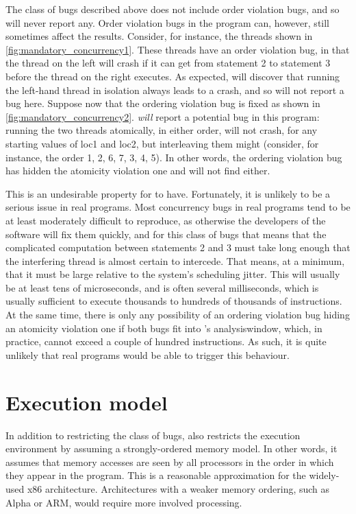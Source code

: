 The class of bugs described above does not include order violation
bugs, and so {\technique} will never report any.  Order violation bugs
in the program can, however, still sometimes affect the results.
Consider, for instance, the threads shown in
\autoref{fig:mandatory_concurrency1}.  These threads have an order
violation bug, in that the thread on the left will crash if it can get
from statement 2 to statement 3 before the thread on the right
executes.  As expected, {\technique} will discover that running the
left-hand thread in isolation always leads to a crash, and so will not
report a bug here.  Suppose now that the ordering violation bug is
fixed as shown in \autoref{fig:mandatory_concurrency2}.  {\Technique}
\emph{will} report a potential bug in this program: running the two
threads atomically, in either order, will not crash, for any starting
values of loc1 and loc2, but interleaving them might (consider, for
instance, the order 1, 2, 6, 7, 3, 4, 5).  In other words, the
ordering violation bug has hidden the atomicity violation one and
{\technique} will not find either.

This is an undesirable property for {\technique} to have.
Fortunately, it is unlikely to be a serious issue in real programs.
Most concurrency bugs in real programs tend to be at least moderately
difficult to reproduce, as otherwise the developers of the software
will fix them quickly, and for this class of bugs that means that the
complicated computation between statements 2 and 3 must take long
enough that the interfering thread is almost certain to intercede.
That means, at a minimum, that it must be large relative to the
system's scheduling jitter.  This will usually be at least tens of
microseconds, and is often several milliseconds, which is usually
sufficient to execute thousands to hundreds of thousands of
instructions.  At the same time, there is only any possibility of an
ordering violation bug hiding an atomicity violation one if both bugs
fit into {\technique}'s \gls{analysiswindow}, which, in practice,
cannot exceed a couple of hundred instructions.  As such, it is quite
unlikely that real programs would be able to trigger this behaviour.

\section{Execution model}

In addition to restricting the class of bugs, {\technique} also
restricts the execution environment by assuming a strongly-ordered
memory model.  In other words, it assumes that memory
accesses are seen by all processors in the order in which they appear
in the program.  This is a reasonable approximation for the
widely-used x86 architecture\needCite{}.  Architectures with a weaker
memory ordering, such as Alpha\needCite{} or ARM\needCite{}, would
require more involved processing.

